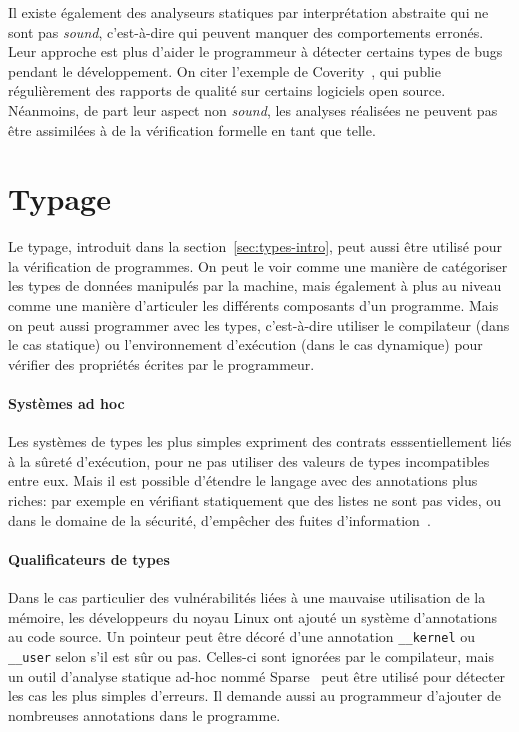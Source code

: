Il existe également des analyseurs statiques par interprétation abstraite qui ne
sont pas \emph{sound}, c'est-à-dire qui peuvent manquer des comportements
erronés. Leur approche est plus d'aider le programmeur à détecter certains types
de bugs pendant le développement. On citer l'exemple de
Coverity~\cite{coverityBillion}, qui publie régulièrement des rapports de
qualité sur certains logiciels open source. Néanmoins, de part leur aspect non
\emph{sound}, les analyses réalisées ne peuvent pas être assimilées à de la
vérification formelle en tant que telle.

\section{Typage}

Le typage, introduit dans la section~\ref{sec:types-intro}, peut aussi être
utilisé pour la vérification de programmes. On peut le voir comme une manière de
catégoriser les types de données manipulés par la machine, mais également à plus
au niveau comme une manière d'articuler les différents composants d'un
programme. Mais on peut aussi programmer avec les types, c'est-à-dire utiliser
le compilateur (dans le cas statique) ou l'environnement d'exécution (dans le
cas dynamique) pour vérifier des propriétés écrites par le programmeur.

\paragraph{Systèmes ad hoc}

Les systèmes de types les plus simples expriment des contrats esssentiellement
liés à la sûreté d'exécution, pour ne pas utiliser des valeurs de types
incompatibles entre eux. Mais il est possible d'étendre le langage avec des
annotations plus riches: par exemple en vérifiant statiquement que des listes
ne sont pas vides\cite{lightweight-static-capabilities}, ou dans le domaine de
la sécurité, d'empêcher des fuites d'information~\cite{LZ06a}.


\paragraph{Qualificateurs de types}

Dans le cas particulier des vulnérabilités liées à une mauvaise utilisation de
la mémoire, les développeurs du noyau Linux ont ajouté un système d'annotations
au code source. Un pointeur peut être décoré d'une annotation
\texttt{\_\_kernel} ou \texttt{\_\_user} selon s'il est sûr ou pas. Celles-ci
sont ignorées par le compilateur, mais un outil d'analyse statique ad-hoc nommé
Sparse~ peut être utilisé pour détecter les cas les plus simples
d'erreurs. Il demande aussi au programmeur d'ajouter de nombreuses annotations
dans le programme.

